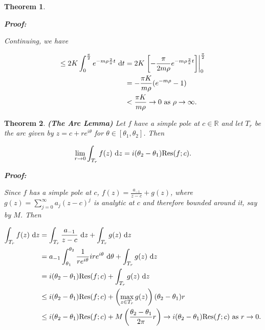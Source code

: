 \documentclass{article}
\theoremstyle{colontheorem}
\newtheorem{theorem}{Theorem}[section]
\newcommand{\Res}{\textnormal{Res}}
\newenvironment{Theorem}
{
	\begin{mdframed}[backgroundcolor=TheoremOrange!10]
	\begin{theorem}
}
{
	\end{theorem}
	\end{mdframed}
	
	\vspace{.15in}
}
\newenvironment{Proof}
{
	\begin{mdframed}[backgroundcolor=ProofPurple!10]
	\textbf{Proof:}%
}
{
	\end{mdframed}
	
	\vspace{.085in}
}
\begin{document}
\begin{Theorem}
\begin{Proof}
		Continuing, we have
		
		\begin{align*}
			\leq 2K \int_0^{\frac{\pi}{2}} e^{-m \rho \frac{2}{\pi} t}\ \textnormal{d}t &= 2K \left. \left[ -\frac{\pi}{2 m \rho} e^{-m \rho \frac{2}{\pi} t} \right] \right|_0^{\frac{\pi}{2}}\\
			&= -\frac{\pi K}{m \rho} (e^{-m \rho} - 1)\\
			&< \frac{\pi K}{m \rho} \to 0 \textnormal{ as }\rho \to \infty.
		\end{align*}
		
	\end{Proof}
	
\end{Theorem}



\begin{Theorem}
	
	\textbf{(The Arc Lemma)} Let $f$ have a simple pole at $c \in \mathbb{R}$ and let $T_r$ be the arc given by $z = c + re^{i \theta}$ for $\theta \in [\theta_1, \theta_2]$. Then
	
	$$
		\lim\limits_{r \to 0} \int_{T_r} f(z)\ \textnormal{d}z = i(\theta_2 - \theta_1) \Res(f; c).
	$$
	
	\begin{Proof}
		Since $f$ has a simple pole at $c$, $f(z) = \frac{a_{-1}}{z - c} + g(z)$, where $g(z) = \displaystyle\sum\limits_{j = 0}^\infty a_j (z - c)^j$ is analytic at $c$ and therefore bounded around it, say by $M$. Then
		
		\begin{align*}
			\int_{T_r} f(z)\ \textnormal{d}z &= \int_{T_r} \frac{a_{-1}}{z - c}\ \textnormal{d}z + \int_{T_r} g(z)\ \textnormal{d}z\\
			&= a_{-1} \int_{\theta_1}^{\theta_2} \frac{1}{re^{i \theta}} i re^{i \theta}\ \textnormal{d}\theta + \int_{T_r} g(z)\ \textnormal{d}z\\
			&= i (\theta_2 - \theta_1) \Res(f; c) + \int_{T_r} g(z)\ \textnormal{d}z\\
			& \leq i (\theta_2 - \theta_1) \Res(f; c) + \left(\max\limits_{z \in T_r} g(z) \right) (\theta_2 - \theta_1)r\\
			& \leq i (\theta_2 - \theta_1) \Res(f; c) + M \left(\frac{\theta_2 - \theta_1}{2\pi} r\right) \to i (\theta_2 - \theta_1) \Res(f; c) \textnormal{ as } r \to 0.			
		\end{align*}
		
	\end{Proof}
	
\end{Theorem}
\end{document}
